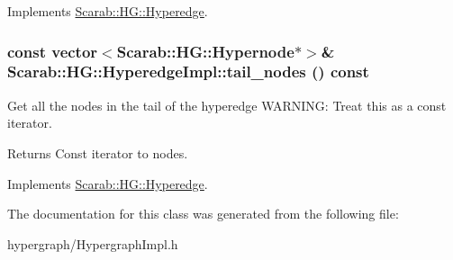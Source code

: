Implements \hyperlink{classScarab_1_1HG_1_1Hyperedge_a9ec8cf9ea7b5f762f359a6f9f1c038da}{Scarab::HG::Hyperedge}.

\hypertarget{classScarab_1_1HG_1_1HyperedgeImpl_a3bf00c8c032397150f59e196aea5e245}{
\subsubsection[{tail\_\-nodes}]{\setlength{\rightskip}{0pt plus 5cm}const vector$<${\bf Scarab::HG::Hypernode}$\ast$$>$\& Scarab::HG::HyperedgeImpl::tail\_\-nodes () const}}
\label{classScarab_1_1HG_1_1HyperedgeImpl_a3bf00c8c032397150f59e196aea5e245}
Get all the nodes in the tail of the hyperedge WARNING: Treat this as a const iterator. \begin{DoxyReturn}{Returns}
Const iterator to nodes. 
\end{DoxyReturn}


Implements \hyperlink{classScarab_1_1HG_1_1Hyperedge_abac6d27691186608aa12949de6e1c283}{Scarab::HG::Hyperedge}.



The documentation for this class was generated from the following file:\begin{DoxyCompactItemize}
\item 
hypergraph/HypergraphImpl.h\end{DoxyCompactItemize}
